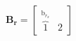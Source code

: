 \documentclass[preview]{standalone}
\begin{document}
\begin{align*}
{\mathbf{B_{r}} = \begin{bmatrix} \overbrace{1}^{\textrm{b}_{r_x}}&  2 \end{bmatrix}}
\end{align*}
\end{document}
